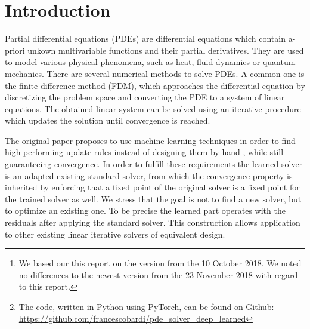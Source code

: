 \documentclass{rescience} %
\begin{document}

\maketitle

\begin{abstract}
This paper is part of the ICLR Reproducibility Challenge 2019. We tried to replicate the results and algorithm for training an iterative partial differential equation solver by interpreting the solver as a linear convolutional neural network and optimizing the weights of the convolutional kernels. We can replicate the results of the original paper \cite{original_paper}\footnote{We based our this report on the version from the 10 October 2018. We noted no differences to the newest version from the 23 November 2018 with regard to this report.}, obtaining a general solver, which generalizes well to a wide variety of geometries and boundary conditions, while achieving high speed ups compared to the baseline solver and guaranteeing convergence.\footnote{The code, written in Python using PyTorch, can be found on Github: \url{https://github.com/francescobardi/pde_solver_deep_learned}}
\end{abstract}

\section{Introduction}

Partial differential equations (PDEs) are differential equations which contain a-priori unkown multivariable functions and their partial derivatives. They are used to model various physical phenomena, such as heat, fluid dynamics or quantum mechanics. There are several numerical methods to solve PDEs. A common one is the finite-difference method (FDM), which approaches the differential equation by discretizing the problem space and converting the PDE to a system of linear equations. The obtained linear system can be solved using an iterative procedure which updates the solution until convergence is reached.

The original paper proposes to use machine learning techniques in order to find high performing update rules instead of designing them by hand \cite{original_paper}, while still guaranteeing convergence.  
In order to fulfill these requirements the learned solver is an adapted existing standard solver, from which the convergence property is inherited by enforcing that a fixed point of the original solver is a fixed point for the trained solver as well. We stress that the goal is not to find a new solver, but to optimize an existing one. To be precise the learned part operates with the residuals after applying the standard solver. This construction allows application to other existing linear iterative solvers of equivalent design.
\end{document}
